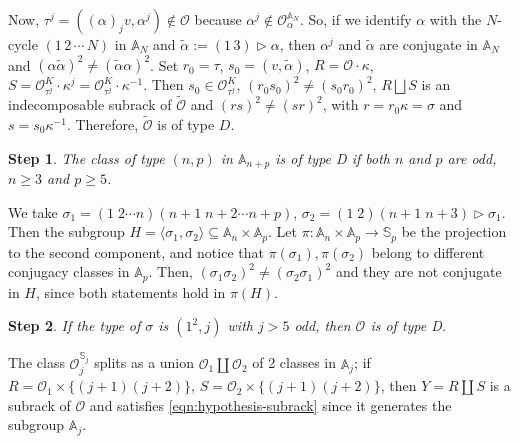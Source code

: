 \documentclass[11pt]{amsart} \textheight 22cm
\renewcommand{\^}[1]{\mbox{$^{\left( #1 \right)}$}}
\renewcommand{\_}[1]{\mbox{$_{\left( #1 \right)}$}}
\newcommand{\trid}{\triangleright}
\newcommand{\Oc}{{\mathcal O}}
\newcommand{\oc}{{\mathcal O}}
\theoremstyle{plain}
\newtheorem{step}{Step}
\theoremstyle{definition}
\theoremstyle{remark}
\newcommand\id{\operatorname{id}}
\newcommand\A{\mathbb A}
\newcommand\s{\mathbb S}
\theoremstyle{remark}
\begin{document}
Now, $\tau^j=((\alpha)_jv,\alpha^j)\not\in \oc$ because
$\alpha^j\not\in \oc_{\alpha}^{\A_N}$. So, if we identify $\alpha$
with the $N$-cycle $(1\, 2\, \cdots \, N)$ in $\A_N$ and
$\widetilde{\alpha}:=(1 \, 3)\trid \alpha$, then $\alpha^j$ and
$\widetilde{\alpha}$ are conjugate in $\A_N$ and
$(\alpha\widetilde{\alpha})^2\neq (\widetilde{\alpha}\alpha)^2$.
Set $r_0=\tau$, $s_0=(v,\widetilde{\alpha})$, $R=\oc \cdot
\kappa$, $S=\oc_{\tau^j}^K \cdot \kappa^j=\oc_{\tau^j}^K \cdot
\kappa^{-1}$. Then $s_0\in\oc_{\tau^j}^K$, $(r_0s_0)^2\neq
(s_0r_0)^2$, $R \bigsqcup S$ is an indecomposable subrack of
$\widetilde{\oc}$ and $(rs)^2\neq (sr)^2$, with
$r=r_0\kappa=\sigma$ and $s=s_0\kappa^{-1}$. Therefore,
$\widetilde{\oc}$ is of type $D$.



\begin{step}\label{step:nm-odd}
The class of type $(n,p)$ in $\A_{n+p}$ is of type D if both $n$
and $p$ are  odd, $n\ge 3$ and $p\ge 5$.
\end{step}




We take $\sigma_1=(1\;2\cdots n)(n+1\;n+2\cdots n+p)$,
    $\sigma_2=(1\;2)(n+1\;n+3)\trid\sigma_1$. Then the subgroup
    $H=\langle\sigma_1,\sigma_2\rangle\subseteq\A_n\times\A_p$. Let
    $\pi:\A_n\times\A_p\to\s_p$ be the projection to the second component, and notice that
    $\pi(\sigma_1),\pi(\sigma_2)$ belong to different conjugacy classes in $\A_p$. Then, $(\sigma_1\sigma_2)^2\neq(\sigma_2\sigma_1)^2$ and they
    are not conjugate in $H$, since both statements hold in $\pi(H)$.





\begin{step}\label{step:dos} If the type of $\sigma$ is $(1^2, j)$ with $j > 5$ odd,
then $\oc$ is of type D. \end{step}

The class $\Oc_j^{\s_j}$ splits as a union $\Oc_1 \coprod \Oc_2$
of 2 classes in $\A_j$; if $R = \Oc_1 \times \{(j + 1)(j+2)\}$, $S
= \Oc_2 \times \{(j + 1)(j+2)\}$, then $Y = R\coprod S$ is a
subrack of $\Oc$ and satisfies \eqref{eqn:hypothesis-subrack}
since it generates the subgroup $\A_j$.
\end{document}
